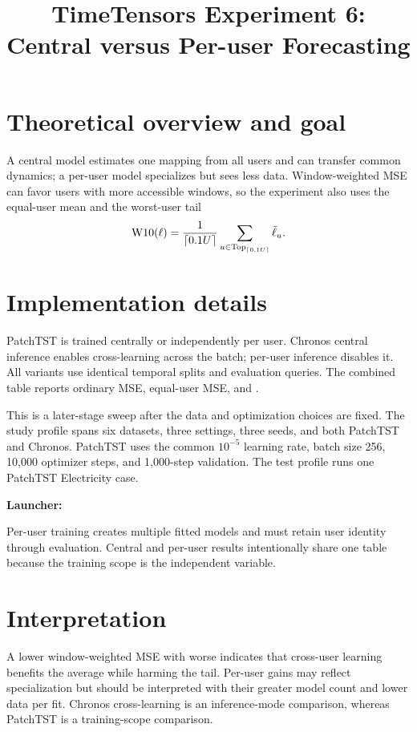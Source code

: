 \documentclass[10pt]{article}
\title{TimeTensors Experiment 6: Central versus Per-user Forecasting}
\author{}
\date{}
\begin{document}
\maketitle
\section{Theoretical overview and goal}
A central model estimates one mapping from all users and can transfer common
dynamics; a per-user model specializes but sees less data.  Window-weighted MSE
can favor users with more accessible windows, so the experiment also uses the
equal-user mean and the worst-user tail
\[
 \Wten(\ell)=\frac{1}{\lceil0.1U\rceil}
 \sum_{u\in\operatorname{Top}_{\lceil0.1U\rceil}}\bar\ell_u.
\]


\section{Implementation details}
PatchTST is trained centrally or independently per user.  Chronos central
inference enables cross-learning across the batch; per-user inference disables
it.  All variants use identical temporal splits and evaluation queries.  The
combined table reports ordinary MSE, equal-user MSE, and \Wten.

This is a later-stage sweep after the data and optimization choices are fixed.
The study profile spans six datasets, three settings, three seeds, and both
PatchTST and Chronos. PatchTST uses the common $10^{-5}$ learning rate, batch
size 256, 10,000 optimizer steps, and 1,000-step validation. The test profile
runs one PatchTST Electricity case.

\textbf{Launcher:} 

Per-user training creates multiple fitted models and must retain user identity
through evaluation.  Central and per-user results intentionally share one table
because the training scope is the independent variable.

\section{Interpretation}
A lower window-weighted MSE with worse \Wten{} indicates that cross-user learning
benefits the average while harming the tail.  Per-user gains may reflect
specialization but should be interpreted with their greater model count and
lower data per fit.  Chronos cross-learning is an inference-mode comparison,
whereas PatchTST is a training-scope comparison.
\end{document}
